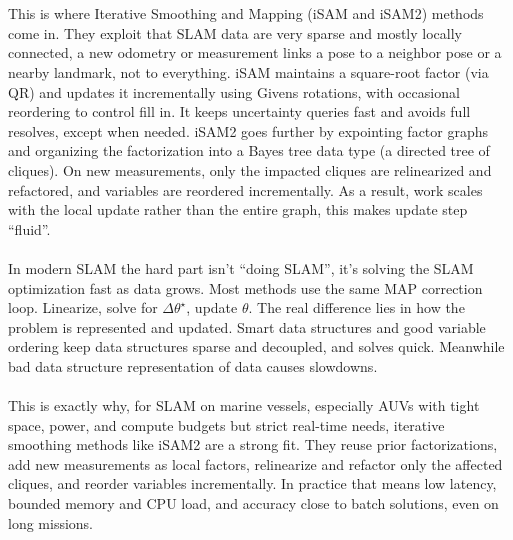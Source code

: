 \\ \\
This is where Iterative Smoothing and Mapping (iSAM and iSAM2) methods come in. They exploit that SLAM data are very sparse and mostly locally connected, a new odometry or measurement links a pose to a neighbor pose or a nearby landmark, not to everything. iSAM maintains a square-root factor (via QR) and updates it incrementally using Givens rotations, with occasional reordering to control fill in. It keeps uncertainty queries fast and avoids full resolves, except when needed. iSAM2 goes further by expointing factor graphs and organizing the factorization into a Bayes tree data type (a directed tree of cliques). On new measurements, only the impacted cliques are relinearized and refactored, and variables are reordered incrementally. As a result, work scales with the local update rather than the entire graph, this makes update step ``fluid''.
\\ \\
In modern SLAM the hard part isn't ``doing SLAM'', it's solving the SLAM optimization fast as data grows. Most methods use the same MAP correction loop. Linearize, solve for $\Delta\theta^\star$, update $\theta$. The real difference lies in how the problem is represented and updated. Smart data structures and good variable ordering keep data structures sparse and decoupled, and solves quick. Meanwhile bad data structure representation of data causes slowdowns.
\\ \\
This is exactly why, for SLAM on marine vessels, especially AUVs with tight space, power, and compute budgets but strict real-time needs, iterative smoothing methods like iSAM2 are a strong fit. They reuse prior factorizations, add new measurements as local factors, relinearize and refactor only the affected cliques, and reorder variables incrementally. In practice that means low latency, bounded memory and CPU load, and accuracy close to batch solutions, even on long missions.